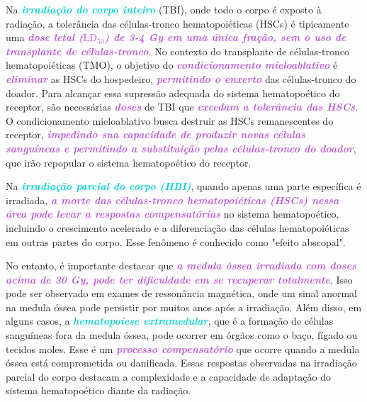 \documentclass[11pt,a4paper]{article}
\begin{document}
	Na \textcolor{DarkTurquoise}{\textbf{\textit{irradiação do corpo inteiro}}} (TBI), onde todo o corpo é exposto à radiação, a tolerância das células-tronco hematopoiéticas (HSCs) é tipicamente uma \textcolor{MediumOrchid}{\textbf{\textit{dose letal ($\text{LD}_{50}$) de 3-4 Gy em uma única fração, sem o uso de transplante de células-tronco}}}. No contexto do transplante de células-tronco hematopoiéticas (TMO), o objetivo do \textcolor{MediumOrchid}{\textbf{\textit{condicionamento mieloablativo}}} é \textcolor{MediumOrchid}{\textbf{\textit{eliminar}}} as HSCs do hospedeiro, \textcolor{MediumOrchid}{\textbf{\textit{permitindo o enxerto}}} das células-tronco do doador. Para alcançar essa supressão adequada do sistema hematopoético do receptor, são necessárias \textcolor{MediumOrchid}{\textbf{\textit{doses}}} de TBI que \textcolor{MediumOrchid}{\textbf{\textit{excedam a tolerância das HSCs}}}. O condicionamento mieloablativo busca destruir as HSCs remanescentes do receptor, \textcolor{MediumOrchid}{\textbf{\textit{impedindo sua capacidade de produzir novas células sanguíneas e permitindo a substituição pelas células-tronco do doador}}}, que irão repopular o sistema hematopoético do receptor.

	Na \textcolor{DarkTurquoise}{\textbf{\textit{irradiação parcial do corpo (HBI)}}}, quando apenas uma parte específica é irradiada, \textcolor{MediumOrchid}{\textbf{\textit{a morte das células-tronco hematopoiéticas (HSCs) nessa área pode levar a respostas compensatórias}}} no sistema hematopoético, incluindo o crescimento acelerado e a diferenciação das células hematopoiéticas em outras partes do corpo. Esse fenômeno é conhecido como "efeito abscopal".

	No entanto, é importante destacar que \textcolor{MediumOrchid}{\textbf{\textit{a medula óssea irradiada com doses acima de 30 Gy, pode ter dificuldade em se recuperar totalmente}}}. Isso pode ser observado em exames de ressonância magnética, onde um sinal anormal na medula óssea pode persistir por muitos anos após a irradiação. Além disso, em alguns casos, a \textcolor{DarkTurquoise}{\textbf{\textit{hematopoiese extramedular}}}, que é a formação de células sanguíneas fora da medula óssea, pode ocorrer em órgãos como o baço, fígado ou tecidos moles. Esse é um \textcolor{MediumOrchid}{\textbf{\textit{processo compensatório}}} que ocorre quando a medula óssea está comprometida ou danificada. Essas respostas observadas na irradiação parcial do corpo destacam a complexidade e a capacidade de adaptação do sistema hematopoético diante da radiação. 
\end{document}
